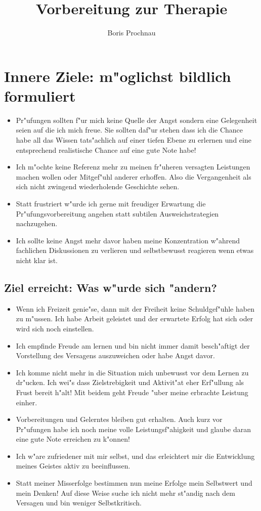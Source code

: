 \documentclass[11pt,a4paper,german]{article}
\author{Boris Prochnau}
\title{Vorbereitung zur Therapie}
\begin{document}
\maketitle

\section{Innere Ziele: m"oglichst bildlich formuliert}
\begin{itemize}
	\item Pr"ufungen sollten f"ur mich keine Quelle der Angst sondern eine Gelegenheit seien auf die ich mich freue. Sie sollten daf"ur stehen dass ich die Chance habe all das Wissen tats"achlich auf einer tiefen Ebene zu erlernen und eine entsprechend realistische Chance auf eine gute Note habe!
	\item Ich m"ochte keine Referenz mehr zu meinen fr"uheren versagten Leistungen machen wollen oder Mitgef"uhl anderer erhoffen. Also die Vergangenheit als sich nicht zwingend wiederholende Geschichte sehen.
	\item Statt frustriert w"urde ich gerne mit freudiger Erwartung die Pr"ufungsvorbereitung angehen statt subtilen Ausweichstrategien nachzugehen.
	\item Ich sollte keine Angst mehr davor haben meine Konzentration w"ahrend fachlichen Diskussionen zu verlieren und selbstbewusst reagieren wenn etwas nicht klar ist.
\end{itemize}
\subsection{Ziel erreicht: Was w"urde sich "andern?}
\begin{itemize}
	\item Wenn ich Freizeit genie"se, dann mit der Freiheit keine Schuldgef"uhle haben zu m"ussen. Ich habe Arbeit geleistet und der erwartete Erfolg hat sich oder wird sich noch einstellen.
	\item Ich empfinde Freude am lernen und bin nicht immer damit besch"aftigt der Vorstellung des Versagens auszuweichen oder habe Angst davor. 
	\item Ich komme nicht mehr in die Situation mich unbewusst vor dem Lernen zu dr"ucken. Ich wei"s dass Zielstrebigkeit und Aktivit"at eher Erf"ullung als Frust bereit h"alt! Mit beidem geht Freude "uber meine erbrachte Leistung einher.
	\item Vorbereitungen und Gelerntes bleiben gut erhalten. Auch kurz vor Pr"ufungen habe ich noch meine volle Leistungsf"ahigkeit und glaube daran eine gute Note erreichen zu k"onnen!
	\item Ich w"are zufriedener mit mir selbst, und das erleichtert mir die Entwicklung meines Geistes aktiv zu beeinflussen.
	\item Statt meiner Misserfolge bestimmen nun meine Erfolge mein Selbstwert und mein Denken! Auf diese Weise suche ich nicht mehr st"andig nach dem Versagen und bin weniger Selbstkritisch.
\end{itemize}
\end{document}
